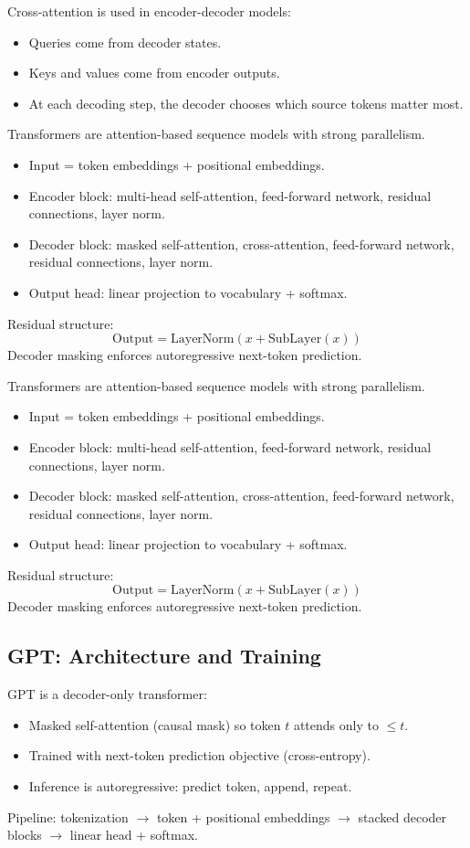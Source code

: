 \documentclass[10pt,a4paper]{article}
\begin{document}
Cross-attention is used in encoder-decoder models:
\begin{itemize}
    \item Queries come from decoder states.
    \item Keys and values come from encoder outputs.
    \item At each decoding step, the decoder chooses which source tokens matter most.
\end{itemize}



Transformers are attention-based sequence models with strong parallelism.
\begin{itemize}
    \item Input = token embeddings + positional embeddings.
    \item Encoder block: multi-head self-attention, feed-forward network, residual connections, layer norm.
    \item Decoder block: masked self-attention, cross-attention, feed-forward network, residual connections, layer norm.
    \item Output head: linear projection to vocabulary + softmax.
\end{itemize}
Residual structure:
\[
\mathrm{Output}=\mathrm{LayerNorm}(x+\mathrm{SubLayer}(x))
\]
Decoder masking enforces autoregressive next-token prediction.

Transformers are attention-based sequence models with strong parallelism.
\begin{itemize}
    \item Input = token embeddings + positional embeddings.
    \item Encoder block: multi-head self-attention, feed-forward network, residual connections, layer norm.
    \item Decoder block: masked self-attention, cross-attention, feed-forward network, residual connections, layer norm.
    \item Output head: linear projection to vocabulary + softmax.
\end{itemize}
Residual structure:
\[
\mathrm{Output}=\mathrm{LayerNorm}(x+\mathrm{SubLayer}(x))
\]
Decoder masking enforces autoregressive next-token prediction.



\subsection{GPT: Architecture and Training}
GPT is a decoder-only transformer:
\begin{itemize}
    \item Masked self-attention (causal mask) so token $t$ attends only to $\leq t$.
    \item Trained with next-token prediction objective (cross-entropy).
    \item Inference is autoregressive: predict token, append, repeat.
\end{itemize}
Pipeline: tokenization $\rightarrow$ token + positional embeddings $\rightarrow$ stacked decoder blocks $\rightarrow$ linear head + softmax.
\end{document}
